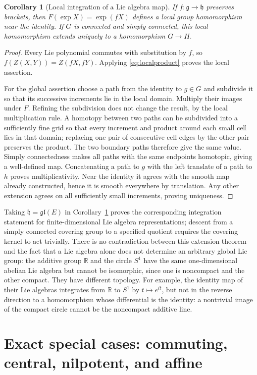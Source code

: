 \documentclass[11pt]{article}
\newtheorem{corollary}[theorem]{Corollary}
\theoremstyle{definition}
\theoremstyle{remark}
\newcommand{\R}{\mathbb R}
\newcommand{\g}{\mathfrak g}
\newcommand{\h}{\mathfrak h}
\numberwithin{equation}{section}
\begin{document}
\begin{corollary}[Local integration of a Lie algebra map]\label{cor:localmap}
If $f:\g\to\h$ preserves brackets, then $F(\exp X)=\exp(fX)$ defines a local group homomorphism near the identity. If $G$ is connected and simply connected, this local homomorphism extends uniquely to a homomorphism $G\to H$.
\end{corollary}
\begin{proof}
Every Lie polynomial commutes with substitution by $f$, so
$f(Z(X,Y))=Z(fX,fY)$. Applying \eqref{eq:localproduct} proves the local assertion.

For the global assertion choose a path from the identity to $g\in G$ and subdivide it so that its successive increments lie in the local domain. Multiply their images under $F$. Refining the subdivision does not change the result, by the local multiplication rule. A homotopy between two paths can be subdivided into a sufficiently fine grid so that every increment and product around each small cell lies in that domain; replacing one pair of consecutive cell edges by the other pair preserves the product. The two boundary paths therefore give the same value. Simply connectedness makes all paths with the same endpoints homotopic, giving a well-defined map. Concatenating a path to $g$ with the left translate of a path to $h$ proves multiplicativity. Near the identity it agrees with the smooth map already constructed, hence it is smooth everywhere by translation. Any other extension agrees on all sufficiently small increments, proving uniqueness.
\end{proof}
Taking $\h=\mathfrak{gl}(E)$ in Corollary~\ref{cor:localmap} proves the corresponding integration statement for finite-dimensional Lie algebra representations; descent from a simply connected covering group to a specified quotient requires the covering kernel to act trivially. There is no contradiction between this extension theorem and the fact that a Lie algebra alone does not determine an arbitrary global Lie group: the additive group $\R$ and the circle $S^1$ have the same one-dimensional abelian Lie algebra but cannot be isomorphic, since one is noncompact and the other compact. They have different topology. For example, the identity map of their Lie algebras integrates from $\R$ to $S^1$ by $t\mapsto e^{it}$, but not in the reverse direction to a homomorphism whose differential is the identity: a nontrivial image of the compact circle cannot be the noncompact additive line.

\section{Exact special cases: commuting, central, nilpotent, and affine}\label{sec:special}
\end{document}
